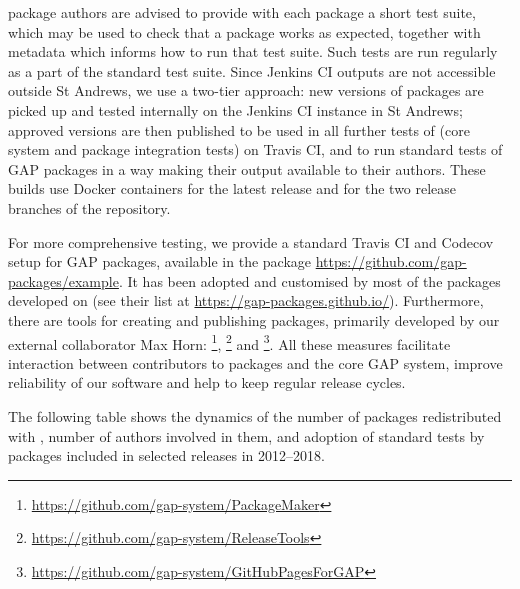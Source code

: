 \documentclass{deliverablereport}
\begin{document}
\GAP package authors are advised to provide with each package a short
test suite, which may be used to check that a package works as expected,
together with metadata which informs \GAP how to run that test suite.
Such tests are run regularly as a part of the standard \GAP test suite.
Since Jenkins CI outputs are not accessible outside St Andrews, we use
a two-tier approach: new versions of \GAP packages are picked up and
tested internally on the Jenkins CI instance in St Andrews; approved
versions are then published to be used in all further tests of \GAP
(core system and package integration tests) on Travis CI, and to run
standard tests of GAP packages in a way making their output available
to their authors. These builds use Docker containers for the latest
\GAP release and for the two release branches of the \GAP repository.

For more comprehensive testing, we provide a standard Travis CI and 
Codecov setup for GAP packages, available in the  package
\url{https://github.com/gap-packages/example}. It has been adopted and
customised by most of the \GAP packages developed on \GitHub (see their
list at \url{https://gap-packages.github.io/}). Furthermore, there are
tools for creating and publishing packages, primarily developed by our
external collaborator Max Horn:
\footnote{\url{https://github.com/gap-system/PackageMaker}},
\footnote{\url{https://github.com/gap-system/ReleaseTools}}
and \footnote{\url{https://github.com/gap-system/GitHubPagesForGAP}}.
All these measures facilitate interaction between contributors to packages
and the core GAP system, improve reliability of our software and help to
keep regular release cycles.

The following table shows the dynamics of the number of packages redistributed
with \GAP, number of authors involved in them, and adoption of standard tests
by packages included in selected \GAP releases in 2012--2018.
\end{document}
